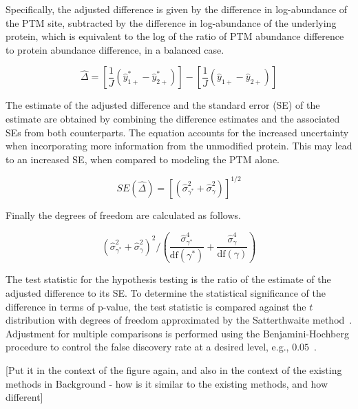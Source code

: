 \documentclass[mcp]{article}
\numberwithin{table}{section}
\def\todo#1{{\color{red}[#1]}}
\begin{document}
Specifically, the adjusted difference is given by the difference in log-abundance of the PTM site, subtracted by the difference in log-abundance of the underlying protein, which is equivalent to the log of the ratio of PTM abundance difference to protein abundance difference, in a balanced case.

\begin{equation}
\hat{\Delta} = \left[ \frac{1}{J} \left( \hat{y}_{1+}^{\ast} - \hat{y}_{2+}^{\ast} \right) \right] - \left[ \frac{1}{J} \left( \hat{y}_{1+} - \hat{y}_{2+} \right) \right]
\label{eq:prop_fc}
\end{equation}

The estimate of the adjusted difference and the standard error (SE) of the estimate are obtained by combining the difference estimates and the associated SEs from both counterparts. The equation accounts for the increased uncertainty when incorporating more information from the unmodified protein. This may lead to an increased SE, when compared to modeling the PTM alone.

\begin{equation}
SE(\hat{\Delta}) = \left[ \left( \hat{\sigma}_{\gamma^{\ast}}^{2} + \hat{\sigma}_{\gamma}^{2} \right) \right]^{1/2}
\label{eq:prop_se}
\end{equation}

Finally the degrees of freedom are calculated as follows.

\begin{equation}
\left( \hat{\sigma}_{\gamma^{\ast}}^{2} + \hat{\sigma}_{\gamma}^{2} \right)^2 \bigg/
\left( \frac{\hat{\sigma}_{\gamma^{\ast}}^{4}}{\mathrm{df}(\gamma^{\ast})} + \frac{\hat{\sigma}_{\gamma}^{4}}{ \mathrm{df}(\gamma)} \right)
\label{eq:prop_df}
\end{equation}

The test statistic for the hypothesis testing is the ratio of the estimate of the adjusted difference to its SE. To determine the statistical significance of the difference in terms of p-value, the test statistic is compared against the $t$ distribution with degrees of freedom approximated by the Satterthwaite method~\cite{satterthwaite:1946}. Adjustment for multiple comparisons is performed using the Benjamini-Hochberg procedure to control the false discovery rate at a desired level, e.g., $0.05$~\cite{Benjamini:1995}.

\todo{Put it in the context of the figure again, and also in the context of the existing methods in Background - how is it similar to the existing methods, and how different} 
\end{document}
